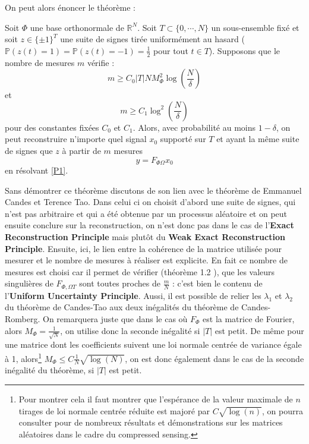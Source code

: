 On peut alors énoncer le théorème :
\begin{theoreme}
	Soit $\Phi$ une base orthonormale de $\mathbb{R}^N$. 
	Soit $T \subset \{0, \cdots, N\}$ un sous-ensemble fixé et soit $z \in \{\pm 1\}^T$ une suite de signes tirée uniformément au hasard ($\mathbb{P}(z(t) = 1) = \mathbb{P}(z(t) = -1) = \frac{1}{2}$ pour tout $t\in T$).
	Supposons que le nombre de mesures $m$ vérifie :
	\begin{equation}
		m\geq C_0 |T| N M_{\Phi}^2 \log(\frac{N}{\delta})
	\end{equation}
	et
	\begin{equation}
		m\geq C_1 \log^2(\frac{N}{\delta})
	\end{equation}
	pour des constantes fixées $C_0$ et $C_1$.
	Alors, avec probabilité au moins $1-\delta$, on peut reconstruire n'importe quel signal $x_0$ supporté sur $T$ et ayant la même suite de signes que $z$ à partir de $m$ mesures
	\begin{equation}
		y = F_{\Phi \Omega} x_0
	\end{equation}
	en résolvant \ref{P1}.
\end{theoreme}
Sans démontrer ce théorème discutons de son lien avec le théorème de Emmanuel Candes et Terence Tao. 
Dans celui ci on choisit d'abord une suite de signes, qui n'est pas arbitraire et qui a été obtenue par un processus aléatoire et on peut ensuite conclure sur la reconstruction, on n'est donc pas dans le cas de l'\textbf{Exact Reconstruction Principle} mais plutôt du \textbf{Weak Exact Reconstruction Principle}.
\newline
Ensuite, ici, le lien entre la cohérence de la matrice utilisée pour mesurer et le nombre de mesures à réaliser est explicite.
En fait ce nombre de mesures est choisi car il permet de vérifier (théorème 1.2 \cite{CR}), que les valeurs singulières de $F_{\Phi, \Omega T}$ sont toutes proches de $\frac{m}{N}$ : c'est bien le contenu de l'\textbf{Uniform Uncertainty Principle}.
\newline
Aussi, il est possible de relier les $\lambda_1$ et $\lambda_2$ du théorème de Candes-Tao aux deux inégalités du théorème de Candes-Romberg. 
On remarquera juste que dans le cas où $F_\Phi$ est la matrice de Fourier, alors $M_\Phi= \frac{1}{\sqrt{N}}$, on utilise donc la seconde inégalité si $|T|$ est petit.
De même pour une matrice dont les coefficients suivent une loi normale centrée de variance égale à 1, alors\footnote{Pour montrer cela il faut montrer que l'espérance de la valeur maximale de $n$ tirages de loi normale centrée réduite est majoré par $C\sqrt{\log(n)}$, on pourra consulter \cite{foucartbook} pour de nombreux résultats et démonstrations sur les matrices aléatoires dans le cadre du compressed sensing.} $M_\Phi \leq C\frac{1}{N}\sqrt{\log(N)}$, on est donc également dans le cas de la seconde inégalité du théorème, si $|T|$ est petit.
